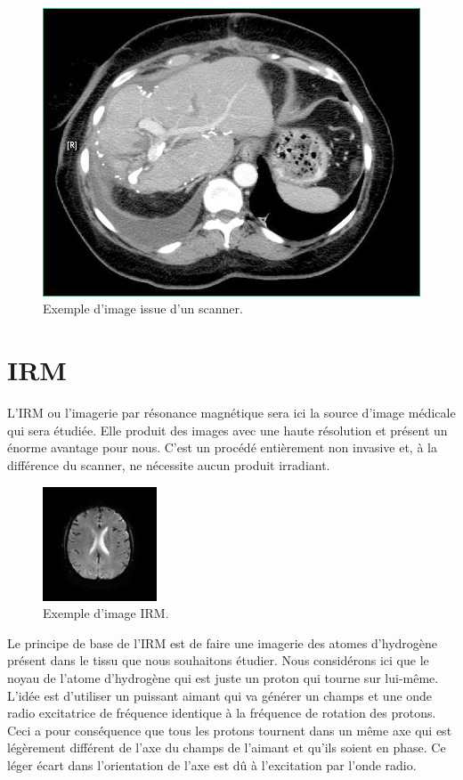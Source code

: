 \begin{figure}[H]
\centering
    \includegraphics[scale=0.4,angle=0]{Images/Scanner.jpg}
    \caption{Exemple d'image issue d'un scanner.}
    \label{fig:m_1407858437}
\end{figure}

\section{IRM}

L'IRM ou l'imagerie par résonance magnétique sera ici la source d'image médicale qui sera étudiée. Elle produit des images avec une haute résolution et présent un énorme avantage pour nous. C'est un procédé entièrement non invasive et, à la différence du scanner, ne nécessite aucun produit irradiant.

\begin{figure}[H]
\centering
    \includegraphics[scale=2,angle=0]{Images/Im7.png}
    \caption{Exemple d'image IRM.}
    \label{fig:m_1407858437}
\end{figure}

Le principe de base de l'IRM est de faire une imagerie des atomes d'hydrogène présent dans le tissu que nous souhaitons étudier. Nous considérons ici que le noyau de l'atome d'hydrogène qui est juste un proton qui tourne sur lui-même. L'idée est d'utiliser un puissant aimant qui va générer un champs et une onde radio excitatrice de fréquence identique à la fréquence de rotation des protons. Ceci a pour conséquence que tous les protons tournent dans un même axe qui est légèrement différent de l'axe du champs de l'aimant et qu'ils soient en phase. Ce léger écart dans l'orientation de l'axe est dû à l'excitation par l'onde radio.

